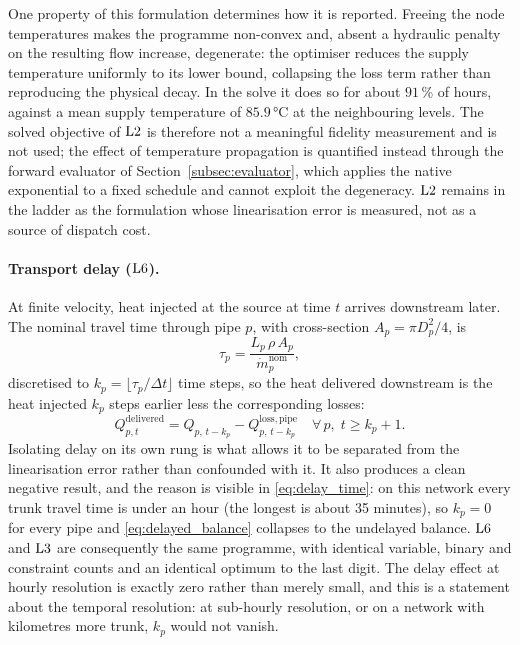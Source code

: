 One property of this formulation determines how it is reported. Freeing the node temperatures
makes the programme non-convex and, absent a hydraulic penalty on the resulting flow
increase, degenerate: the optimiser reduces the supply temperature uniformly to its lower
bound, collapsing the loss term rather than reproducing the physical decay. In the solve it
does so for about $91$\,\% of hours, against a mean supply temperature of $85.9$\,°C at the
neighbouring levels. The solved objective of $\mathrm{L2}$ is therefore not a meaningful fidelity
measurement and is not used; the effect of temperature propagation is quantified
instead through the forward evaluator of Section~\ref{subsec:evaluator}, which applies the
native exponential to a fixed schedule and cannot exploit the degeneracy. $\mathrm{L2}$ remains in
the ladder as the formulation whose linearisation error is measured, not as a source of
dispatch cost.

\paragraph{Transport delay ($\mathrm{L6}$).}
At finite velocity, heat injected at the source at time $t$ arrives downstream later. The
nominal travel time through pipe $p$, with cross-section $A_p = \pi D_p^2/4$, is
%
\begin{equation}
  \tau_p = \frac{L_p\, \rho\, A_p}{\dot{m}_p^{\mathrm{nom}}},
  \label{eq:delay_time}
\end{equation}
%
discretised to $k_p = \lfloor \tau_p/\Delta t \rfloor$ time steps, so the heat delivered
downstream is the heat injected $k_p$ steps earlier less the corresponding losses:
%
\begin{equation}
  Q_{p,t}^{\mathrm{delivered}} =
    Q_{p,\,t-k_p} - Q_{p,\,t-k_p}^{\mathrm{loss,pipe}}
  \quad \forall\, p,\; t \geq k_p{+}1.
  \label{eq:delayed_balance}
\end{equation}
%
Isolating delay on its own rung is what allows it to be separated from the linearisation
error rather than confounded with it. It also produces a clean negative
result, and the reason is visible in \eqref{eq:delay_time}: on this network every trunk
travel time is under an hour (the longest is about 35 minutes), so $k_p = 0$ for every
pipe and \eqref{eq:delayed_balance} collapses to the undelayed balance. $\mathrm{L6}$ and
$\mathrm{L3}$ are consequently the same programme, with identical variable, binary and
constraint counts and an identical optimum to the last digit. The delay effect at hourly
resolution is exactly zero rather than merely small, and this is a statement about the
temporal resolution: at sub-hourly resolution, or on a network with kilometres more trunk,
$k_p$ would not vanish.
